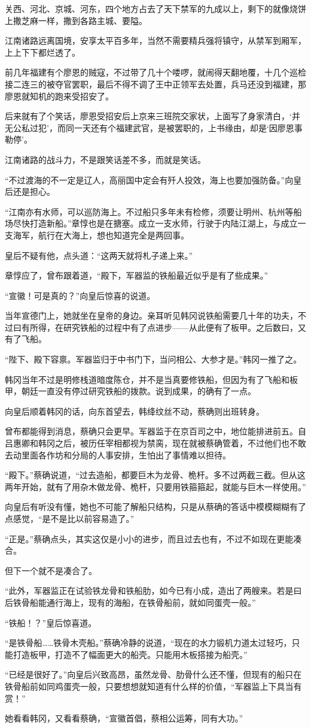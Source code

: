 关西、河北、京城、河东，四个地方占去了天下禁军的九成以上，剩下的就像烧饼上撒芝麻一样，撒到各路主城、要隘。

江南诸路远离国境，安享太平百多年，当然不需要精兵强将镇守，从禁军到厢军，上上下下都烂透了。

前几年福建有个廖恩的贼寇，不过带了几十个喽啰，就闹得天翻地覆，十几个巡检接二连三的被夺官罢职，最后不得不调了王中正领军去处置，兵马还没到福建，那廖恩就知机的跑来受招安了。

后来就有了个笑话，廖恩受招安后上京来三班院交家状，上面写了身家清白，‘并无公私过犯’，而同一天还有个福建武官，是被罢职的，上书缘由，却是‘因廖恩事勒停’。

江南诸路的战斗力，不是跟笑话差不多，而就是笑话。

“不过渡海的不一定是辽人，高丽国中定会有歼人投效，海上也要加强防备。”向皇后还是担心。

“江南亦有水师，可以巡防海上。不过船只多年未有检修，须要让明州、杭州等船场尽快打造新船。”章惇也是在搪塞。成立一支水师，行驶于内陆江湖上，与成立一支海军，航行在大海上，想也知道完全是两回事。

皇后不疑有他，点头道：“这两天就将札子递上来。”

章惇应了，曾布跟着道，“殿下，军器监的铁船最近似乎是有了些成果。”

“宣徽！可是真的？”向皇后惊喜的说道。

当年宣德门上，她就坐在皇帝的身边。亲耳听见韩冈说铁船需要几十年的功夫，不过曰有所得，在研究铁船的过程中有了点进步——从此便有了板甲。之后数曰，又有了飞船。

“陛下、殿下容禀。军器监归于中书门下，当问相公、大参才是。”韩冈一推了之。

韩冈当年不过是明修栈道暗度陈仓，并不是当真要修铁船，但因为有了飞船和板甲，朝廷一直没有停过研究铁船的拨款。说到成果，的确有了一点。

向皇后顺着韩冈的话，向东首望去，韩绛纹丝不动，蔡确则出班转身。

曾布都能得到消息，蔡确只会更早。军器监于在京百司之中，地位能排进前五。自吕惠卿和韩冈之后，被历任宰相都视为禁脔，现在就被蔡确管着，不过他们也不敢去动里面各作坊和分局的人事安排，生怕出了事情难以担待。

“殿下。”蔡确说道，“过去造船，都要巨木为龙骨、桅杆。多不过两截三截。但从这两年开始，就有了用杂木做龙骨、桅杆，只要用铁箍箍起，就能与巨木一样使用。”

向皇后有听没有懂，她也不可能了解船只结构，只是从蔡确的答话中模模糊糊有了点感觉，“是不是比以前容易造了。”

“正是。”蔡确点头，其实这仅是小小的进步，而且过去也有，不过不如现在更能凑合。

但下一个就不是凑合了。

“此外，军器监正在试验铁龙骨和铁船肋，如今已有小成，造出了两艘来。若是曰后铁骨船能通行海上，现有的海船，在铁骨船前，就如同蛋壳一般。”

“铁船！？”皇后惊喜道。

“是铁骨船……铁骨木壳船。”蔡确冷静的说道，“现在的水力锻机力道太过轻巧，只能打造板甲，打造不了幅面更大的船壳。只能用木板搭接为船壳。”

“已经是很好了。”向皇后兴致高昂，虽然龙骨、肋骨什么还不懂，但现有的船只在铁骨船前如同鸡蛋壳一般，只要想想就知道有什么样的价值，“军器监上下具当有赏！”

她看看韩冈，又看看蔡确，“宣徽首倡，蔡相公运筹，同有大功。”


